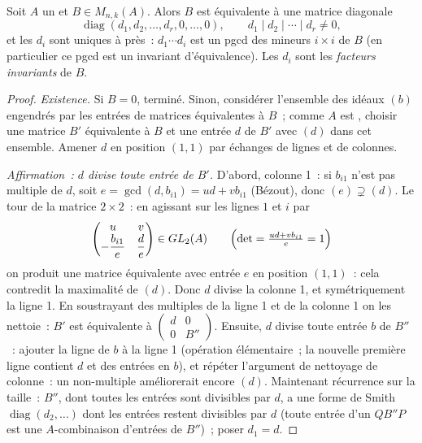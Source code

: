 \begin{theorem}\label{thm:b3:modules:smith}
Soit $A$ un  et $B \in M_{n,k}(A)$. Alors $B$ est équivalente
à une matrice diagonale
\[
\operatorname{diag}(d_1, d_2, \dots, d_r, 0, \dots, 0),
\qquad d_1 \mid d_2 \mid \cdots \mid d_r \neq 0 ,
\]
et les $d_i$ sont uniques à  près~: $d_1 \cdots d_i$ est
un pgcd des mineurs $i \times i$ de $B$ (en particulier ce pgcd
est un invariant d'équivalence). Les $d_i$ sont les
\emph{facteurs invariants} de $B$.
\end{theorem}

\begin{proof}
\emph{Existence.} Si $B = 0$, terminé. Sinon, considérer
l'ensemble des idéaux $(b)$ engendrés par les entrées de
matrices équivalentes à $B$~; comme $A$ est , choisir
une matrice $B'$ équivalente à $B$ et une entrée $d$ de $B'$
avec $(d)$ \emph{} dans cet ensemble. Amener $d$ en
position $(1,1)$ par échanges de lignes et de colonnes.

\emph{Affirmation~: $d$ divise toute entrée de $B'$.} D'abord,
colonne 1~: si $b_{i1}$ n'est pas multiple de $d$, soit $e =
\gcd(d, b_{i1}) = ud + vb_{i1}$ (Bézout), donc $(e) \supsetneq
(d)$. Le tour de la matrice $2 \times 2$~: en agissant sur les
lignes $1$ et $i$ par
\[
\begin{pmatrix} u & v \\ -\dfrac{b_{i1}}e & \dfrac de
\end{pmatrix}
\in GL_2(A)
\qquad
\Bigl(\det = \tfrac{ud + v b_{i1}}e = 1\Bigr)
\]
on produit une matrice équivalente avec entrée $e$ en position
$(1,1)$~: cela contredit la maximalité de $(d)$. Donc $d$ divise
la colonne 1, et symétriquement la ligne 1. En soustrayant des
multiples de la ligne 1 et de la colonne 1 on les nettoie~: $B'$
est équivalente à $\begin{pmatrix} d & 0\\ 0 &
B''\end{pmatrix}$. Ensuite, $d$ divise toute entrée $b$ de
$B''$~: ajouter la ligne de $b$ à la ligne 1 (opération
élémentaire~; la nouvelle première ligne contient $d$ et des
entrées en $b$), et répéter l'argument de nettoyage de colonne~:
un non-multiple améliorerait encore $(d)$. Maintenant récurrence
sur la taille~: $B''$, dont toutes les entrées sont divisibles
par $d$, a une forme de Smith $\operatorname{diag}(d_2, \dots)$
dont les entrées restent divisibles par $d$ (toute entrée d'un
$QB''P$ est une $A$-combinaison d'entrées de $B''$)~; poser $d_1
= d$.


\end{proof}
